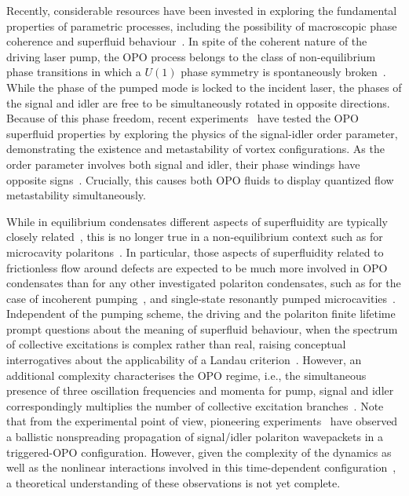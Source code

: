 Recently, considerable resources have been invested in exploring the
fundamental properties of parametric processes, including the
possibility of macroscopic phase coherence and superfluid
behaviour~\cite{Carusotto_2013}.
%
In spite of the coherent nature of the driving laser pump, the OPO
process belongs to the class of non-equilibrium phase transitions in
which a $U(1)$ phase symmetry is spontaneously
broken~\cite{Wouters_2007}.
%
While the phase of the pumped mode is locked to the incident laser,
the phases of the signal and idler are free to be simultaneously rotated in
opposite directions.
%
Because of this phase freedom, recent experiments~\cite{Sanvitto_2010}
have tested the OPO superfluid properties by exploring the physics of
the signal-idler order parameter, demonstrating the existence and
metastability of vortex configurations. As the order parameter
involves both signal and idler, their phase windings have opposite
signs~\cite{Sanvitto_2010,Marchetti_2010,9783642241857}.  Crucially, this
causes both OPO fluids to display quantized flow metastability
simultaneously.

While in equilibrium condensates different aspects of superfluidity
are typically closely related~\cite{Leggett_1999}, this is no longer
true in a non-equilibrium context such as for microcavity
polaritons~\cite{Carusotto_2013}.
%
In particular, those aspects of superfluidity related to 
frictionless flow around defects are expected to be much more involved
in OPO condensates than for any other investigated polariton
condensates, such as for the case of incoherent
pumping~\cite{Kasprzak_2006,Wouters_2010}, and single-state
resonantly pumped microcavities~\cite{Amo_2009}.
%
Independent of the pumping scheme, the driving and the polariton
finite lifetime prompt questions about the meaning of superfluid
behaviour, when the spectrum of collective excitations is complex
rather than real, raising conceptual interrogatives about the
applicability of a Landau criterion~\cite{Wouters_2010}.
%
However, an additional complexity characterises the OPO regime, i.e., the
simultaneous presence of three oscillation frequencies and momenta for
pump, signal and idler correspondingly multiplies the number of
collective excitation branches~\cite{Wouters_2007}.
%
Note that from the experimental point of view, pioneering
experiments~\cite{Amo_2009_b} have observed a ballistic nonspreading
propagation of signal/idler polariton wavepackets in a triggered-OPO
configuration.
%
However, given the complexity of the dynamics as well as the nonlinear
interactions involved in this time-dependent
configuration~\cite{Szyma_ska_2010}, a theoretical understanding of these
observations is not yet complete.

